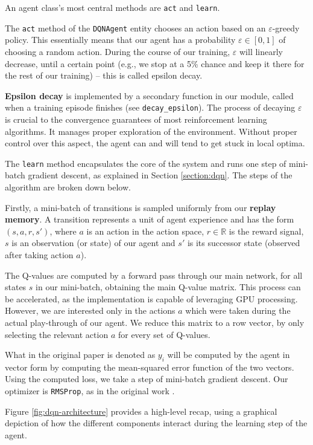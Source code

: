 An agent class’s most central methods are \texttt{act} and \texttt{learn}.

The \texttt{act} method of the \texttt{DQNAgent} entity chooses an action based on an $\varepsilon$-greedy policy.
This essentially means that our agent has a probability $\varepsilon \in [0, 1]$ of choosing a random action.
During the course of our training, $\varepsilon$ will linearly decrease, until a certain point (e.g., we stop at a 5\% chance and keep it there for the rest of our training) -- this is called epsilon decay.

\textbf{Epsilon decay} is implemented by a secondary function in our module, called when a training episode finishes (see \verb|decay_epsilon|).
The process of decaying $\varepsilon$ is crucial to the convergence guarantees of most reinforcement learning algorithms.
It manages proper exploration of the environment.
Without proper control over this aspect, the agent can and will tend to get stuck in local optima.

The \verb|learn| method encapsulates the core of the system and runs one step of mini-batch gradient descent, as explained in Section \ref{section:dqn}.
The steps of the algorithm are broken down below.

Firstly, a mini-batch of transitions is sampled uniformly from our \textbf{replay memory}.
A transition represents a unit of agent experience and has the form $(s, a, r, s')$, where $a$ is an action in the action space, $r \in \mathbb{R}$ is the reward signal, $s$ is an observation (or state) of our agent and $s'$ is its successor state (observed after taking action $a$).

The Q-values are computed by a forward pass through our main network, for all states $s$ in our mini-batch, obtaining the main Q-value matrix.
This process can be accelerated, as the implementation is capable of leveraging GPU processing.
However, we are interested only in the actions $a$ which were taken during the actual play-through of our agent.
We reduce this matrix to a row vector, by only selecting the relevant action $a$ for every set of Q-values.

What in the original paper is denoted as $y_i$ will be computed by the agent in vector form by computing the mean-squared error function of the two vectors.
Using the computed loss, we take a step of mini-batch gradient descent.
Our optimizer is \verb|RMSProp|, as in the original work \cite{atari-dqn}.

Figure \ref{fig:dqn-architecture} provides a high-level recap, using a graphical depiction of how the different components interact during the learning step of the agent.

